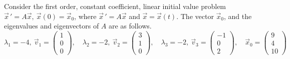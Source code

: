 \ifnum {}
\question[10] Consider the first order, constant coefficient, linear initial value problem $\vec x \, ' = A\vec x, \ \vec x (0) = \vec x_0$, where $\vec x \, ' = A\vec x$ and $\vec x = \vec x(t)$. The vector $\vec x_0$, and the eigenvalues and eigenvectors of $A$ are as follows. 
$$\lambda_1 = -4, \ \vec v_1 = \begin{pmatrix}1\\0\\0 \end{pmatrix} , \quad \lambda_2 = -2, \ \vec v_2 = \begin{pmatrix} 3\\1\\0 \end{pmatrix}, \quad \lambda_3 = -2, \ \vec v_3 = \begin{pmatrix} -1\\0\\2\end{pmatrix}, \quad \vec x_0 = \begin{pmatrix} 9\\4\\10\end{pmatrix}$$
\fi


